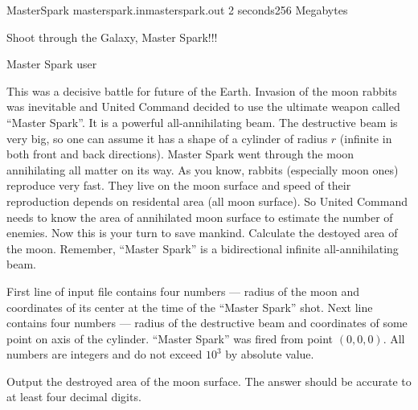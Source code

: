 \begin{problem}{MasterSpark}
{masterspark.in}{masterspark.out}
{2 seconds}{256 Megabytes}

\epigraph{Shoot through the Galaxy, Master Spark!!!}{Master Spark user}

This was a decisive battle for future of the Earth.
Invasion of the moon rabbits was inevitable and
United Command decided to use the ultimate weapon called ``Master Spark''.
It is a powerful all-annihilating beam.
The destructive beam is very big, so one can assume it has a shape
of a cylinder of radius $r$ (infinite in both front and back directions).
Master Spark went through the moon annihilating all matter on its way.
As you know, rabbits (especially moon ones) reproduce very fast.
They live on the moon surface and speed of their reproduction depends on
residental area (all moon surface). So United Command needs to know the area
of annihilated moon surface to estimate the number of enemies.
Now this is your turn to save mankind.
Calculate the destoyed area of the moon.
Remember, ``Master Spark'' is a bidirectional infinite all-annihilating beam.

\InputFile

First line of input file contains four numbers --- radius of the moon
and coordinates of its center at the time of the ``Master Spark'' shot.
Next line contains four numbers --- radius of the destructive beam and
coordinates of some point on axis of the cylinder. ``Master Spark'' was
fired from point $(0,0,0)$. All numbers are integers and do not
exceed $10^3$ by absolute value.

\OutputFile

Output the destroyed area of the moon surface.
The answer should be accurate to at least four decimal digits.

\Examples

\begin{example}
%
%
\end{example}

\end{problem}
